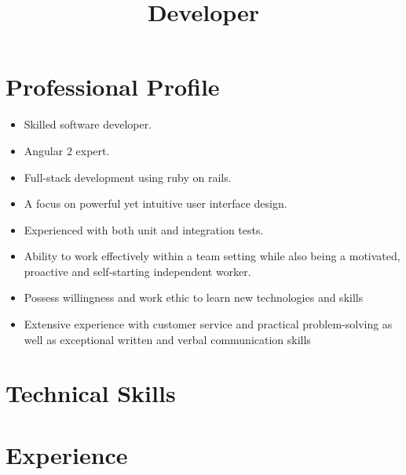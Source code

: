 \documentclass[11pt,a4paper,sans]{moderncv}        %
\title{Developer}                               %
\begin{document}
\makecvtitle
\section{Professional Profile}
\begin{itemize}%
	\item Skilled software developer.
	\item Angular 2 expert.
	\item Full-stack development using ruby on rails.
	\item A focus on powerful yet intuitive user interface design.
	\item Experienced with both unit and integration tests. 
	\item Ability to work effectively within a team setting	while also being a motivated, proactive and self-starting independent worker.
	\item Possess willingness and work ethic to learn new technologies and skills
	\item Extensive experience with customer service and practical problem-solving as well as exceptional written and verbal communication skills
\end{itemize}

\section{Technical Skills}


\section{Experience}
\end{document}
